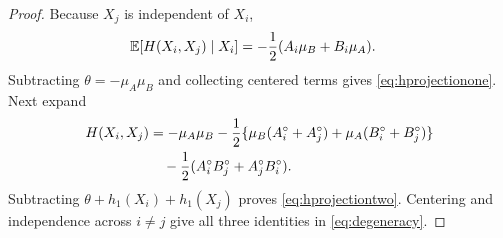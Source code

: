 \begin{proof}
Because $X_j$ is independent of $X_i$,
\begin{align}
 \mathbb{E}[H(X_i,X_j)\mid X_i]
 &=-\frac12(A_i\mu_B+B_i\mu_A).
\end{align}
Subtracting $\theta=-\mu_A\mu_B$ and collecting centered terms gives
\cref{eq:hprojectionone}.  Next expand
\begin{align}
 H(X_i,X_j)
 &=-\mu_A\mu_B
 -\frac12\{\mu_B(A_i^\circ+A_j^\circ)
            +\mu_A(B_i^\circ+B_j^\circ)\}\notag\\
 &\quad-\frac12(A_i^\circ B_j^\circ+A_j^\circ B_i^\circ).
\end{align}
Subtracting $\theta+h_1(X_i)+h_1(X_j)$ proves
\cref{eq:hprojectiontwo}.  Centering and independence across $i\ne j$ give
all three identities in \cref{eq:degeneracy}.
\end{proof}

